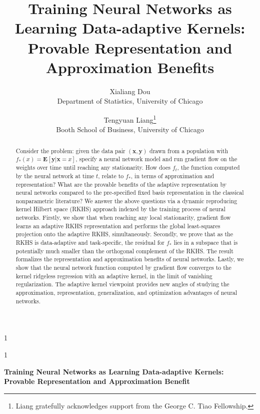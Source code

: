 \documentclass[11pt]{article}
\newcommand{\blind}{1}
\numberwithin{equation}{section}
\begin{document}

\blind
{
  \title{\bf Training Neural Networks as Learning Data-adaptive Kernels: Provable Representation and Approximation Benefits}
  \author{Xialiang Dou \\
   Department of Statistics, University of Chicago
    \and 
    Tengyuan Liang\thanks{
    Liang gratefully acknowledges support from the George C. Tiao Fellowship.}\\
    Booth School of Business, University of Chicago}
	\date{}
  \maketitle
} \fi

\blind
{
  \bigskip
  \bigskip
  \bigskip
  \begin{center}
    {\LARGE\bf Training Neural Networks as Learning Data-adaptive Kernels: Provable Representation and Approximation Benefit}
\end{center}
  \medskip
} \fi

\bigskip
\begin{abstract}
Consider the problem: given the data pair $(\mathbf{x}, \mathbf{y})$ drawn from a population with $f_*(x) = \mathbf{E}[\mathbf{y} | \mathbf{x} = x]$, specify a neural network model and run gradient flow on the weights over time until reaching any stationarity. How does $f_t$, the function computed by the neural network at time $t$, relate to $f_*$, in terms of approximation and representation? What are the provable benefits of the adaptive representation by neural networks compared to the pre-specified fixed basis representation in the classical nonparametric literature? We answer the above questions via a dynamic reproducing kernel Hilbert space (RKHS) approach indexed by the training process of neural networks. Firstly, we show that when reaching any local stationarity, gradient flow learns an adaptive RKHS representation and performs the global least-squares projection onto the adaptive RKHS, simultaneously. Secondly, we prove that as the RKHS is data-adaptive and task-specific, the residual for $f_*$ lies in a subspace that is potentially much smaller than the orthogonal complement of the RKHS. The result formalizes the representation and approximation benefits of neural networks. Lastly, we show that the neural network function computed by gradient flow converges to the kernel ridgeless regression with an adaptive kernel, in the limit of vanishing regularization. The adaptive kernel viewpoint provides new angles of studying the approximation, representation, generalization, and optimization advantages of neural networks.
\end{abstract}
\end{document}
